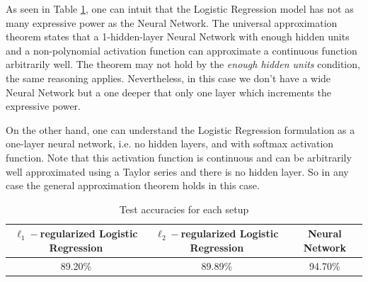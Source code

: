 \documentclass{article}
\begin{document}
As seen in Table \ref{tab:acc}, one can intuit that the Logistic Regression model has not as many expressive power as the Neural Network. The universal approximation theorem states that a 1-hidden-layer Neural Network with enough hidden units and a non-polynomial activation function can approximate a continuous function arbitrarily well. The theorem may not hold by the \textit{enough hidden units} condition, the same reasoning applies. Nevertheless, in this case we don't have a wide Neural Network but a one deeper that only one layer which increments the expressive power.

On the other hand, one can understand the Logistic Regression formulation as a one-layer neural network, i.e. no hidden layers, and with softmax activation function. Note that this activation function is continuous and can be arbitrarily well approximated using a Taylor series and there is no hidden layer. So in any case the general approximation theorem holds in this case.

\begin{table}[H]
    \centering
    \begin{tabular}{ccc}
        \toprule
        $\ell_1-$regularized Logistic Regression &  $\ell_2-$regularized Logistic Regression & Neural Network\\
        \midrule
        89.20\% & 89.89\% & 94.70\% \\
        \bottomrule
    \end{tabular}
    \caption{Test accuracies for each setup}
    \label{tab:acc}
\end{table}
\end{document}
